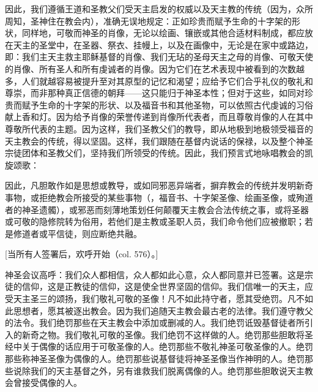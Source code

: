 因此，我们遵循王道和圣教父们受天主启发的权威以及天主教的传统（因为，众所周知，圣神住在教会内），准确无误地规定：正如珍贵而赋予生命的十字架的形状，同样地，可敬而神圣的肖像，无论以绘画、镶嵌或其他合适材料制成，都应放在天主的圣堂中，在圣器、祭衣、挂幔上，以及在画像中，无论是在家中或路边，即：我们主天主救主耶稣基督的肖像、我们无玷的圣母天主之母的肖像、可敬天使的肖像、所有圣人和所有虔诚者的肖像。因为它们在艺术表现中被看到的次数越多，人们就越容易被提升至对其原型的记忆和渴望；应给予它们合乎礼仪的敬礼和尊崇，而非那种真正信德的朝拜——这只能归于神圣本性；但对于这些，如同对珍贵而赋予生命的十字架的形状、以及福音书和其他圣物，可以依照古代虔诚的习俗献上香和灯。因为给予肖像的荣誉传递到肖像所代表者，而且尊敬肖像的人在其中尊敬所代表的主题。因为这样，我们圣教父们的教导，即从地极到地极领受福音的天主教会的传统，得以坚固。这样，我们跟随在基督内说话的保禄，以及整个神圣宗徒团体和圣教父们，坚持我们所领受的传统。因此，我们预言式地咏唱教会的凯旋颂歌：\par

因此，凡胆敢作如是思想或教导，或如同邪恶异端者，摒弃教会的传统并发明新奇事物，或拒绝教会所接受的某些事物（，福音书、十字架圣像、绘画圣像，或殉道者的神圣遗髑），或邪恶而刻薄地策划任何颠覆天主教会合法传统之事，或将圣器或可敬的隐修院转为俗用，若他们是主教或圣职人员，我们命令他们应被撤职；若是修道者或平信徒，则应断绝共融。\par

[当所有人签署后，欢呼开始（col. 576）。]\par

神圣会议高呼：我们众人都相信，众人都如此心意，众人都同意并已签署。这是宗徒的信仰，这是正教徒的信仰，这是使全世界坚固的信仰。我们信唯一的天主，应受天主圣三的颂扬，我们敬礼可敬的圣像！凡不如此持守者，愿其受绝罚。凡不如此思想者，愿其被逐出教会。因为我们追随天主教会最古老的法律。我们遵守教父的法令。我们绝罚那些在天主教会中添加或删减的人。我们绝罚诋毁基督徒者所引入的新奇之物。我们敬礼可敬的圣像。我们绝罚不这样做的人。绝罚那些胆敢将圣经中关于偶像的话应用于可敬圣像的人。绝罚那些不敬礼神圣可敬圣像的人。绝罚那些称神圣圣像为偶像的人。绝罚那些说基督徒将神圣圣像当作神明的人。绝罚那些说除我们的天主基督之外，另有谁救我们脱离偶像的人。绝罚那些胆敢说天主教会曾接受偶像的人。\par

